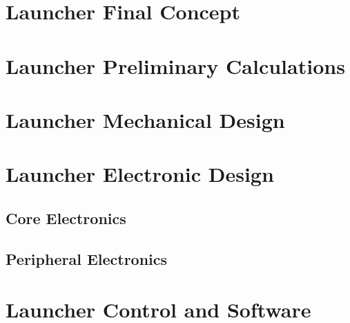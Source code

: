 \section{Launcher Final Concept}
\label{sec:Launcher Final Concept}

\clearpage
\section{Launcher Preliminary Calculations}
\label{sec:Launcher Preliminary Calculations}

\clearpage
\section{Launcher Mechanical Design}
\label{sec:Launcher Mechanical Design}

\clearpage
\section{Launcher Electronic Design}
\label{sec:Launcher Electronic Design}
  \subsection{Core Electronics}
  \label{sub:Core Electronics}
  \subsection{Peripheral Electronics}
  \label{sub:Peripheral Electronics}


\clearpage
\section{Launcher Control and Software}
\label{sec:Launcher Control and Software}
